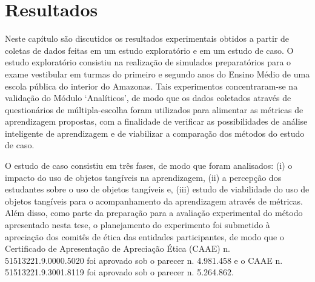 
\chapter{Resultados} \label{Chap:Results}

Neste capítulo são discutidos os resultados experimentais obtidos a partir de coletas de dados feitas em um estudo exploratório e em um estudo de caso. O estudo exploratório consistiu na realização de simulados preparatórios para o exame vestibular em turmas do primeiro e segundo anos do Ensino Médio de uma escola pública do interior do Amazonas. Tais experimentos concentraram-se na validação do Módulo `Analíticos', de modo que os dados coletados através de questionários de múltipla-escolha foram utilizados para alimentar as métricas de aprendizagem propostas, com a finalidade de verificar as possibilidades de análise inteligente de aprendizagem e de viabilizar a comparação dos métodos do estudo de caso.

O estudo de caso consistiu em três fases, de modo que foram analisados: (i) o impacto do uso de objetos tangíveis na aprendizagem, (ii) a percepção dos estudantes sobre o uso de objetos tangíveis e, (iii) estudo de viabilidade do uso de objetos tangíveis para o acompanhamento da aprendizagem através de métricas. Além disso, como parte da preparação para a avaliação experimental do método apresentado nesta tese, o planejamento do experimento foi submetido à apreciação dos comitês de ética das entidades participantes, de modo que o Certificado de Apresentação de Apreciação Ética (CAAE) n. 51513221.9.0000.5020 foi aprovado sob o parecer n. 4.981.458 e o CAAE n. 51513221.9.3001.8119 foi aprovado sob o parecer n. 5.264.862.




